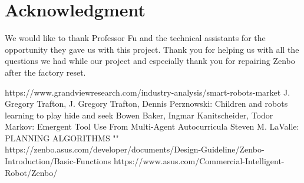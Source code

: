 \documentclass[conference]{IEEEtran}
\begin{document}
\section*{Acknowledgment}
We would like to thank Professor Fu and the technical assistants for the opportunity they gave us with this project.
Thank you for helping us with all the questions we had while our project and especially thank you for repairing Zenbo after the factory reset.\\
\begin{thebibliography}{00}
	 https://www.grandviewresearch.com/industry-analysis/smart-robots-market
	 J. Gregory Trafton, J. Gregory Trafton, Dennis Perznowski: Children and robots learning to play hide and seek
	 Bowen Baker, Ingmar Kanitscheider, Todor Markov: Emergent Tool Use From Multi-Agent Autocurricula
	 Steven M. LaValle: PLANNING ALGORITHMS
	  ""
	 https://zenbo.asus.com/developer/documents/Design-Guideline/Zenbo-Introduction/Basic-Functions
	 https://www.asus.com/Commercial-Intelligent-Robot/Zenbo/
\end{thebibliography}
\vspace{12pt}
\end{document}
